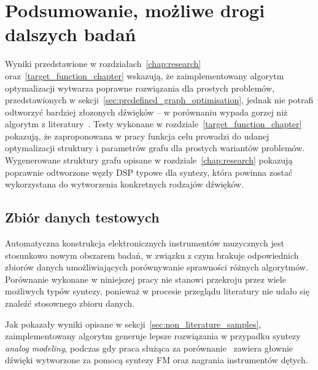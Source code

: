 \chapter{Podsumowanie, możliwe drogi dalszych badań}\label{chap:results_analysis}


Wyniki przedstawione w rozdziałach~\ref{chap:research} oraz~\ref{target_function_chapter}
wskazują, że zaimplementowany algorytm optymalizacji wytwarza poprawne rozwiązania
dla prostych problemów, przedstawionych w sekcji~\ref{sec:predefined_graph_optimisation},
jednak nie potrafi odtworzyć bardziej złozonych dźwięków -- w porównaniu
wypada gorzej niż algorytm z literatury~\cite{evolutionary_puredata}.
Testy wykonane w rozdziale~\ref{target_function_chapter} pokazują,
że zaproponowana w pracy funkcja celu prowadzi do udanej optymalizacji
struktury i parametrów grafu dla prostych wariantów problemów.
Wygenerowane struktury grafu opisane w rozdziale~\ref{chap:research} pokazują
poprawnie odtworzone węzły DSP typowe dla syntezy, która powinna zostać
wykorzystana do wytworzenia konkretnych rodzajów dźwięków.



\section{Zbiór danych testowych}\label{sec:not_enough_benchmarking_data}

Automatyczna konstrukcja elektronicznych instrumentów muzycznych jest stosunkowo
nowym obszarem badań, w związku z czym brakuje odpowiednich zbiorów danych
umożliwiających porównywanie sprawności różnych algorytmów.
Porównanie wykonane w niniejszej pracy nie stanowi przekroju
przez wiele możliwych typów syntezy, ponieważ w procesie przeglądu
literatury nie udało się znaleźć stosownego zbioru danych.

Jak pokazały wyniki opisane w sekcji~\ref{sec:non_literature_samples},
zaimplementowany algorytm generuje lepsze rozwiązania w przypadku
syntezy \textit{analog modeling}, podczas gdy praca służąca
za porównanie~\cite{evolutionary_puredata} zawiera głownie dźwięki wytworzone
za pomocą syntezy FM oraz nagrania instrumentów dętych.


